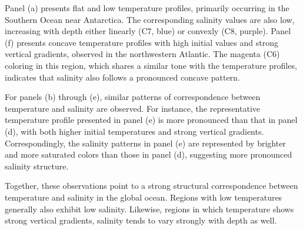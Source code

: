 \documentclass[11pt]{article}
\theoremstyle{plain}
\begin{document}
Panel (a) presents flat and low temperature profiles, primarily occurring in the Southern Ocean near Antarctica. The corresponding salinity values are also low, increasing with depth either linearly (C7, blue) or convexly (C8, purple). Panel (f) presents concave temperature profiles with high initial values and strong vertical gradients, observed in the northwestern Atlantic. The magenta (C6) coloring in this region, which shares a similar tone with the temperature profiles, indicates that salinity also follows a pronounced concave pattern.

For panels (b) through (e), similar patterns of correspondence between temperature and salinity are observed. For instance, the representative temperature profile presented in panel (e) is more pronounced than that in panel (d), with both higher initial temperatures and strong vertical gradients. Correspondingly, the salinity patterns in panel (e) are represented by brighter and more saturated colors than those in panel (d), suggesting more pronounced salinity structure.

Together, these observations point to a strong structural correspondence between temperature and salinity in the global ocean. Regions with low temperatures generally also exhibit low salinity. Likewise, regions in which temperature shows strong vertical gradients, salinity tends to vary strongly with depth as well.
\end{document}
